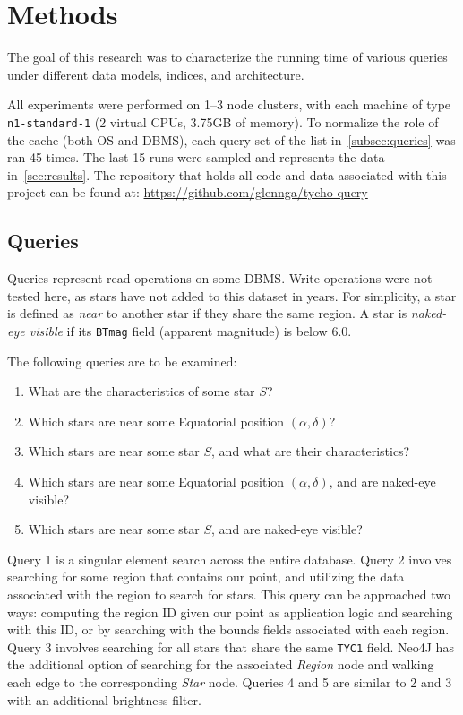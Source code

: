 \section{Methods}\label{sec:methods}
The goal of this research was to characterize the running time of various queries under different data models, indices,
and architecture.

All experiments were performed on 1--3 node clusters, with each machine of type \texttt{n1-standard-1} (2 virtual CPUs,
3.75GB of memory).
To normalize the role of the cache (both OS and DBMS), each query set of the list in~\autoref{subsec:queries} was ran
45 times.
The last 15 runs were sampled and represents the data in~\autoref{sec:results}.
The repository that holds all code and data associated with this project can be found at:
\url{https://github.com/glennga/tycho-query}

\subsection{Queries}\label{subsec:queries}
Queries represent read operations on some DBMS\@.
Write operations were not tested here, as stars have not added to this dataset in years.
For simplicity, a star is defined as \textit{near} to another star if they share the same region.
A star is \textit{naked-eye visible} if its \texttt{BTmag} field (apparent magnitude) is below 6.0.

The following queries are to be examined:
\begin{enumerate}
    \item What are the characteristics of some star $S$?
    \item Which stars are near some Equatorial position $(\alpha, \delta)$?
    \item Which stars are near some star $S$, and what are their characteristics?
    \item Which stars are near some Equatorial position $(\alpha, \delta)$, and are naked-eye visible?
    \item Which stars are near some star $S$, and are naked-eye visible?
\end{enumerate}

Query 1 is a singular element search across the entire database.
Query 2 involves searching for some region that contains our point, and utilizing the data associated with the
region to search for stars.
This query can be approached two ways: computing the region ID given our point as application logic and searching with
this ID, or by searching with the bounds fields associated with each region.
Query 3 involves searching for all stars that share the same \texttt{TYC1} field.
Neo4J has the additional option of searching for the associated \textit{Region} node and walking each edge to the
corresponding \textit{Star} node.
Queries 4 and 5 are similar to 2 and 3 with an additional brightness filter.

